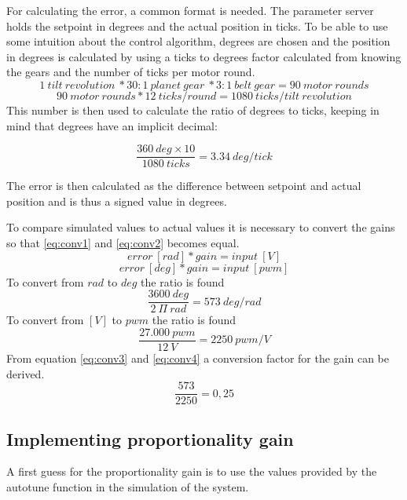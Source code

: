 For calculating the error, a common format is needed. The parameter server holds the setpoint in degrees and the actual position in ticks. To be able to use some intuition about the control algorithm, degrees are chosen and the position in degrees is calculated by using a ticks to degrees factor calculated from knowing the gears and the number of ticks per motor round.
\begin{equation}
1 \ tilt \ revolution \ * 30:1 \ planet \ gear \ * 3:1 \ belt \ gear = 90 \ motor \ rounds
\end{equation}
\begin{equation}
 90 \ motor \ rounds * 12 \ ticks/round = 1080 \ ticks/tilt \ revolution
\end{equation}
This number is then used to calculate the ratio of degrees to ticks, keeping in mind that degrees have an implicit decimal:

\begin{equation}
\frac{360 \ deg \times 10}{1080 \ ticks} = 3.34\ deg/tick 
\end{equation}

The error is then calculated as the difference between setpoint and actual position and is thus a signed value in degrees.

To compare simulated values to actual values it is necessary to convert the gains so that \ref{eq:conv1} and \ref{eq:conv2} becomes equal. 
\begin{equation}
error \ [rad] * gain = input \ [V]
\label{eq:conv1}
\end{equation}
\begin{equation}
error \ [deg] * gain = input \ [pwm]
\label{eq:conv2}
\end{equation}
To convert from $rad$ to $deg$ the ratio is found
\begin{equation}
\frac{3600 \ deg}{2 \ \Pi \ rad} = 573 \ deg/rad
\label{eq:conv3}
\end{equation}
To convert from $[V]$ to $pwm$ the ratio is found
\begin{equation}
\frac{27.000 \ pwm}{12 \ V} = 2250 \ pwm/V
\label{eq:conv4}
\end{equation}
From equation \ref{eq:conv3} and \ref{eq:conv4} a conversion factor for the gain can be derived.
\begin{equation}
\frac{573}{2250} = 0,25
\label{eq:conv}
\end{equation}

\subsection{Implementing proportionality gain}
A first guess for the proportionality gain is to use the values provided by the autotune function in the simulation of the system. 

